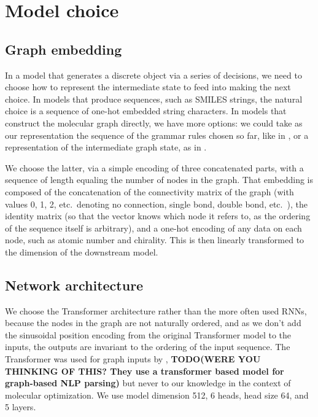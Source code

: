 \documentclass{article}
\newcommand{\TODO}[1]{{\bf TODO(#1)}}
\begin{document}


\section{Model choice}\label{sec:model}
\subsection{Graph embedding}
In a model that generates a discrete object via a series of decisions, we need to choose how to represent the intermediate state to feed into making the next choice. In models that produce sequences, such as SMILES strings, the natural choice is a sequence of one-hot embedded string characters. In models that construct the molecular graph directly, we have more options: we could take as our representation the sequence of the grammar rules chosen so far, like in \cite{kusner2017, kraev2018}, or a representation of the intermediate graph state, as in \cite{you2018}.

We choose the latter, via a simple encoding of three concatenated parts, with a sequence of length equaling the number of nodes in the graph. That embedding is composed of the concatenation of the connectivity matrix of the graph (with values 0, 1, 2, etc.~denoting no connection, single bond, double bond, etc.~), the identity matrix (so that the vector knows which node it refers to, as the ordering of the sequence itself is arbitrary), and a one-hot encoding of any data on each node, such as atomic number and chirality. This is then linearly transformed to the dimension of the downstream model.

\subsection{Network architecture}
We choose the Transformer architecture \cite{vaswani2017} rather than the more often used RNNs, because the nodes in the graph are not naturally ordered, and as we don't add the sinusoidal position encoding from the original Transformer model to the inputs, the outputs are invariant to the ordering of the input sequence. The Transformer was used for graph inputs by \cite{kondratyuk2019}, \TODO{WERE YOU THINKING OF THIS? They use a transformer based model for graph-based NLP parsing} but never to our knowledge in the context of molecular optimization. We use model dimension 512, 6 heads, head size 64, and 5 layers. 
\end{document}
